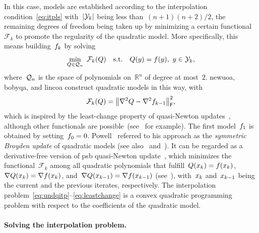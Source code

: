 \documentclass[
    smallextended,  %
    draft,          %
    final,          %
]{svjour3}
\newcommand{\R}{\mathbb{R}}
\newcommand{\abs}[2][]{#1\lvert#2#1\rvert}
\newcommand{\frob}{\mathsf{F}}
\newcommand{\func}{\mathcal{F}}
\newcommand{\iter}[1][k]{x\ifthenelse{\equal{#1}{}}{}{_{#1}}}
\newcommand{\norm}[2][]{#1\lVert#2#1\rVert}
\newcommand{\objm}[1][k]{\obj\ifthenelse{\equal{#1}{}}{}{_{#1}}}
\newcommand{\obj}{f}
\newcommand{\qspace}[1][n]{\mathcal{Q}\ifthenelse{\equal{#1}{}}{}{_{#1}}}
\newcommand{\st}{\text{s.t.}}
\newcommand{\xpt}[1][k]{\mathcal{Y}\ifthenelse{\equal{#1}{}}{}{_{#1}}}
\begin{document}
In this case, models are established according to the interpolation condition~\eqref{eq:itpls}
with~$\abs{\xpt}$ being less than~$(n + 1)(n + 2) / 2$, the remaining degrees of freedom being taken
up by minimizing a certain functional~$\func_k$ to promote the regularity of the quadratic model.
More specifically, this means building~$\objm$ by solving
\begin{equation}
    \label{eq:undqitp}
        \min_{Q \in \qspace} ~ \func_k(Q) \quad \st \quad Q(y) = \obj(y), ~ y \in \xpt,
\end{equation}
where~$\qspace$ is the space of polynomials on~$\R^n$ of degree at most~$2$.
\gls{newuoa}, \gls{bobyqa}, and \gls{lincoa} construct quadratic models in this way, with
\begin{equation}
    \label{eq:leastchange}
    \func_k(Q) = \norm[\big]{\nabla^2 Q - \nabla^2 \objm[k - 1]}_{\frob}^2,
\end{equation}
which is inspired by the least-change property of quasi-Newton updates~\cite{Dennis_Schnabel_1979},
although other functionals are possible~(see~\cite{Conn_Toint_1996,Bandeira_Scheinberg_Vicente_2012,Powell_2013,Zhang_2014,Xie_Yuan_2023} for example).
The first model~$\objm[1]$ is obtained by setting~$\objm[0] = 0$.
Powell~\cite{Powell_2013} referred to his approach as the \emph{symmetric Broyden update} of
quadratic models (see also~\cite[\S~3.6]{Zhang_2012} and~\cite[\S~2.4.2]{Ragonneau_2022}).
It can be regarded as a derivative-free version of \gls{psb} quasi-Newton update~\cite{Powell_1970b}, which minimizes the functional~$\func_k$ among all quadratic polynomials that fulfill~$Q(\iter) = \obj(\iter)$, $\nabla Q(\iter) = \nabla \obj(\iter)$, and~$\nabla Q(\iter[k - 1]) = \nabla \obj(\iter[k - 1])$ (see~\cite[Theorem~4.2]{Dennis_Schnabel_1979}), with~$\iter$ and~$\iter[k - 1]$ being the current and the previous iterates, respectively.
The interpolation problem~\mbox{\eqref{eq:undqitp}--\eqref{eq:leastchange}} is a convex quadratic
programming problem with respect to the coefficients of the quadratic model.

\paragraph{\textnormal{\textbf{Solving the interpolation problem.}}}
\end{document}
